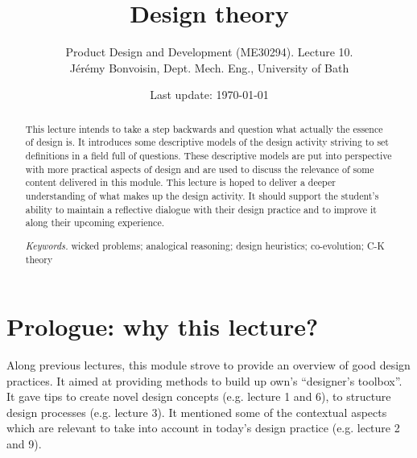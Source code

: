 \documentclass{article}
\begin{document}
\title{Design theory}

\author{Product Design and Development (ME30294). Lecture 10. \\ Jérémy Bonvoisin, Dept. Mech. Eng., University of Bath}
\date{Last update: \today}

\maketitle

\begin{abstract}
This lecture intends to take a step backwards and question what actually the essence of design is. It introduces some descriptive models of the design activity striving to set definitions in a field full of questions. These descriptive models are put into perspective with more practical aspects of design and are used to discuss the relevance of some content delivered in this module. This lecture is hoped to deliver a deeper understanding of what makes up the design activity. It should support the student's ability to maintain a reflective dialogue with their design practice and to improve it along their upcoming experience.

{{\it Keywords.} wicked problems; analogical reasoning; design heuristics; co-evolution; C-K theory}
\end{abstract}

\tableofcontents

\section{Prologue: why this lecture?}
\label{sec:prologue}
Along previous lectures, this module strove to provide an overview of good design practices. It aimed at providing methods to build up own's ``designer's toolbox''. It gave tips to create novel design concepts (e.g. lecture 1 and 6), to structure design processes (e.g. lecture 3). It mentioned some of the contextual aspects which are relevant to take into account in today's design practice (e.g. lecture 2 and 9). 
\end{document}
